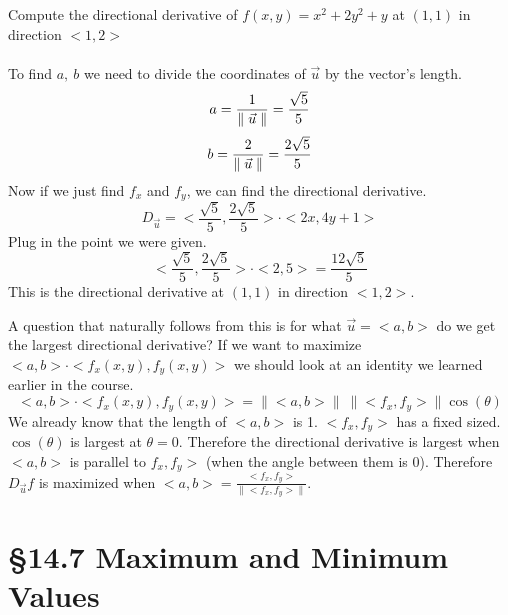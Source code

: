 \documentclass[12 pt]{article}
\begin{document}
        \begin{exmp*}
            Compute the directional derivative of $f(x,y)=x^2+2y^2+y$ at $(1,1)$ in direction $<1,2>$\\\\
            To find $a,\ b$ we need to divide the coordinates of $\vec{u}$ by the vector's length.
            $$a=\frac{1}{\parallel \vec{u} \parallel}=\frac{\sqrt{5}}{5}$$
            $$b=\frac{2}{\parallel \vec{u} \parallel}=\frac{2\sqrt{5}}{5}$$
            Now if we just find $f_x$ and $f_y$, we can find the directional derivative.
            $$D_{\vec{u}}=<\frac{\sqrt{5}}{5},\frac{2\sqrt{5}}{5}>\cdot<2x,4y+1>$$
            Plug in the point we were given.
            $$<\frac{\sqrt{5}}{5},\frac{2\sqrt{5}}{5}>\cdot<2,5>=\frac{12\sqrt{5}}{5}$$
            This is the directional derivative at $(1,1)$ in direction $<1,2>$.
        \end{exmp*}

        A question that naturally follows from this is for what $\vec{u}=<a,b>$ do we get the largest directional derivative? If we want to maximize $<a,b>\cdot<f_x(x,y),f_y(x,y)>$ we should look at an identity we learned earlier in the course.
        $$<a,b>\cdot<f_x(x,y),f_y(x,y)>=\parallel<a,b>\parallel\ \parallel<f_x,f_y>\parallel\cos(\theta)$$
        We already know that the length of $<a,b>$ is 1. $<f_x,f_y>$ has a fixed sized. $\cos(\theta)$ is largest at $\theta=0$. Therefore the directional derivative is largest when $<a,b>$ is parallel to $f_x,f_y>$ (when the angle between them is 0). Therefore $D_{\vec{u}}f$ is maximized when $<a,b>=\frac{<f_x,f_y>}{\parallel<f_x,f_y>\parallel}$.
    \section{\S 14.7 Maximum and Minimum Values}
\end{document}
